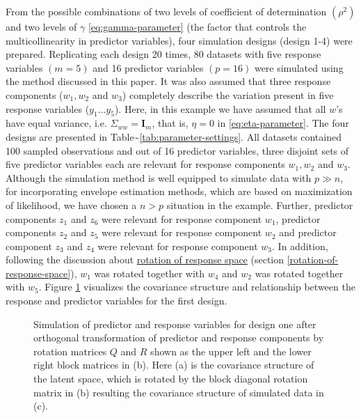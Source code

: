 \documentclass[review]{elsarticle}
\theoremstyle{definition}
\theoremstyle{definition}
\theoremstyle{definition}
\theoremstyle{remark}
\begin{document}
From the possible combinations of two levels of coefficient of
determination \((\rho^2)\) and two levels of \(\gamma\)
\eqref{eq:gamma-parameter} (the factor that controls the multicollinearity
in predictor variables), four simulation designs (design 1-4) were
prepared. Replicating each design 20 times, 80 datasets with five
response variables \((m=5)\) and 16 predictor variables \((p = 16)\)
were simulated using the method discussed in this paper. It was also
assumed that three response components (\(w_1, w_2\) and \(w_3\))
completely describe the variation present in five response variables
(\(y_1 \ldots y_5\)). Here, in this example we have assumed that all
\(w\)'s have equal variance, i.e. \(\Sigma_{ww} = \mathbf{I}_m\), that
is, \(\eta = 0\) in \eqref{eq:eta-parameter}. The four designs are
presented in Table\textasciitilde{}\ref{tab:parameter-settings}. All
datasets contained 100 sampled observations and out of 16 predictor
variables, three disjoint sets of five predictor variables each are
relevant for response components \(w_1, w_2\) and \(w_3\). Although the
simulation method is well equipped to simulate data with \(p \gg n\),
for incorporating envelope estimation methods, which are based on
maximization of likelihood, we have chosen a \(n > p\) situation in the
example. Further, predictor components \(z_1\) and \(z_6\) were relevant
for response component \(w_1\), predictor components \(z_2\) and \(z_5\)
were relevant for response component \(w_2\) and predictor component
\(z_3\) and \(z_4\) were relevant for response component \(w_3\). In
addition, following the discussion about
\protect\hyperlink{rotation-of-response-space}{rotation of response
space} (section \ref{rotation-of-response-space}), \(w_1\) was rotated
together with \(w_4\) and \(w_2\) was rotated together with \(w_5\).
Figure \ref{fig:cov-plot-print-1} visualizes the covariance structure
and relationship between the response and predictor variables for the
first design.









\begin{figure}[!htb]
\caption{Simulation of predictor and response variables for design
one after orthogonal transformation of predictor and response components
by rotation matrices \(Q\) and \(R\) shown as the upper left and the
lower right block matrices in (b). Here (a) is the covariance structure
of the latent space, which is rotated by the block diagonal rotation
matrix in (b) resulting the covariance structure of simulated data in
(c).}\label{fig:cov-plot-print-1}
\end{figure}
\end{document}
